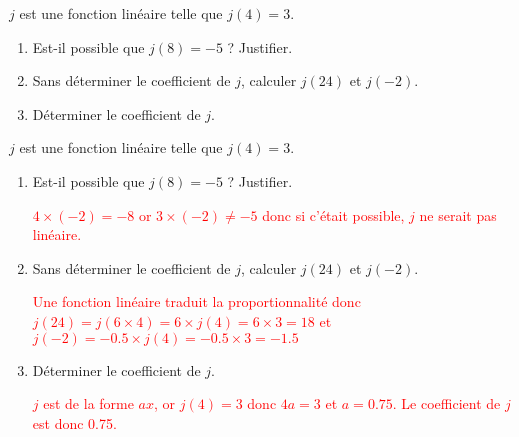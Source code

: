 \begin{exercice*}
    $j$ est une fonction linéaire telle que $j(4)=3$.
    \begin{enumerate}
        \item Est-il possible que $j(8)=-5$ ? Justifier.
        \item Sans déterminer le coefficient de $j$, calculer $j(24)$ et $j(-2)$.
        \item Déterminer le coefficient de $j$.
    \end{enumerate}
\end{exercice*}
\begin{corrige}
    $j$ est une fonction linéaire telle que $j(4)=3$.
    \begin{enumerate}
        \item Est-il possible que $j(8)=-5$ ? Justifier.
        
        \textcolor{red}{$4\times (-2) = -8$ or $3\times (-2) \neq -5$ donc si c'était possible, $j$ ne serait pas linéaire.}
        \item Sans déterminer le coefficient de $j$, calculer $j(24)$ et $j(-2)$.
        
        \textcolor{red}{Une fonction linéaire traduit la proportionnalité donc $j(24)=j(6\times 4)=6\times j(4)=6\times 3=18$
        et $j(-2)=\num{-0.5}\times j(4) = \num{-0.5}\times 3 = \num{-1.5}$}
        \item Déterminer le coefficient de $j$.
        
        \textcolor{red}{$j$ est de la forme $ax$, or $j(4)=3$ donc $4a=3$ et $a=\num{0.75}$. Le coefficient de $j$ est donc \num{0.75}.}
    \end{enumerate}
\end{corrige}
